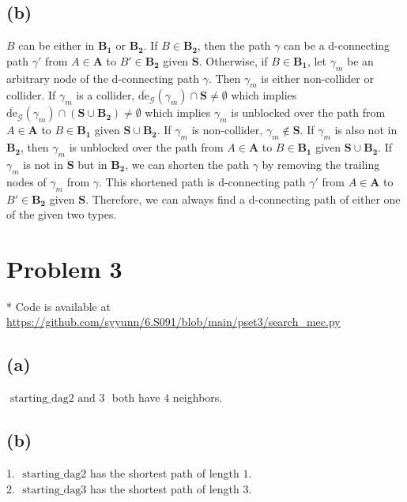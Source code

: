 \documentclass[10pt]{article}
\begin{document}
\subsection{(b)}
$B$ can be either in $\mathbf{B_1}$ or $\mathbf{B_2}$. If $B \in \mathbf{B_2}$, then the path $\gamma$ can be a d-connecting path $\gamma'$ from $A \in \mathbf{A}$ to $B' \in \mathbf{B_2}$ given $\mathbf{S}$. Otherwise, 
if $B \in \mathbf{B_1}$, let $\gamma_m$ be an arbitrary node of the d-connecting path $\gamma$. 
Then $\gamma_m$ is either non-collider or collider.
If $\gamma_m$ is a collider, 
$\overline{\text{de}}_\mathcal{G}(\gamma_m) \cap \mathbf{S} \neq\emptyset$ which implies 
$\overline{\text{de}}_\mathcal{G}(\gamma_m) \cap \left(\mathbf{S} \cup \mathbf{B_2}\right)\neq\emptyset$ which implies $\gamma_m$ is unblocked over the path from $A \in \mathbf{A}$ to $B \in \mathbf{B_1}$ given $\mathbf{S} \cup \mathbf{B_2}$.
If $\gamma_m$ is non-collider, $\gamma_m \notin \mathbf{S}$. 
If $\gamma_m$ is also not in $\mathbf{B_2}$, then $\gamma_m$ is unblocked over the path from $A \in \mathbf{A}$ to $B \in \mathbf{B_1}$ given $\mathbf{S} \cup \mathbf{B_2}$.
If $\gamma_m$ is not in $\mathbf{S}$ but in $\mathbf{B_2}$, we can shorten the path $\gamma$ by removing the trailing nodes of $\gamma_m$ from $\gamma$. 
This shortened path is d-connecting path $\gamma'$ from $A \in \mathbf{A}$ to $B' \in \mathbf{B_2}$ given $\mathbf{S}$.
Therefore, we can always find a d-connecting path of either one of the given two types.




\section{Problem 3}
* Code is available at \url{https://github.com/syyunn/6.S091/blob/main/pset3/search_mec.py}

\subsection{(a)}
$\text { starting\_dag2 and 3 }$ both have $4$ neighbors. 
\subsection{(b)}
1. $\text { starting\_dag2}$ has the shortest path of length $1$.\\
2. $\text { starting\_dag3}$ has the shortest path of length $3$.
\end{document}
